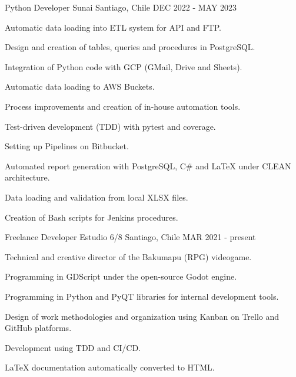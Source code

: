 

\begin{cventries}
	
\cventry
{Python Developer} %
{Sunai} %
{Santiago, Chile} %
{DEC 2022 - MAY 2023} %
{
	\begin{cvitems} %
		\item {Automatic data loading into ETL system for API and FTP.}
		\item {Design and creation of tables, queries and procedures in PostgreSQL.}
		\item {Integration of Python code with GCP (GMail, Drive and Sheets).}
		\item {Automatic data loading to AWS Buckets.}
		\item {Process improvements and creation of in-house automation tools.}
        \item {Test-driven development (TDD) with pytest and coverage.}
		\item {Setting up Pipelines on Bitbucket.}
		\item {Automated report generation with PostgreSQL, C\# and LaTeX under CLEAN architecture.}
        \item {Data loading and validation from local XLSX files.}
		\item {Creation of Bash scripts for Jenkins procedures.}
	\end{cvitems}
}

  \cventry
    {Freelance Developer} %
    {Estudio 6/8} %
    {Santiago, Chile} %
    {MAR 2021 - present} %
    {
      \begin{cvitems} %
        \item {Technical and creative director of the Bakumapu (RPG) videogame.}
        \item {Programming in GDScript under the open-source Godot engine.}
        \item {Programming in Python and PyQT libraries for internal development tools.}
        \item {Design of work methodologies and organization using Kanban on Trello and GitHub platforms.}
        \item {Development using TDD and CI/CD.}
        \item {LaTeX documentation automatically converted to HTML.} 
      \end{cvitems}
    }


\end{cventries}
